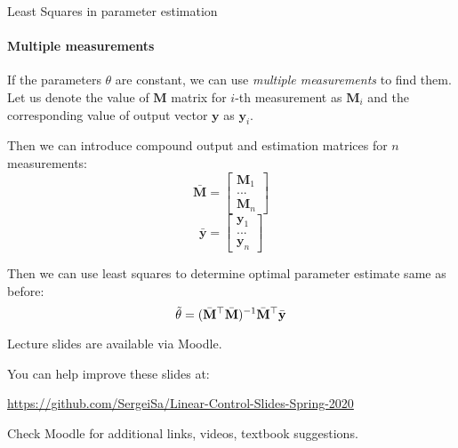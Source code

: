 \documentclass{beamer}
\begin{document}
\begin{frame}{Least Squares in parameter estimation}
\framesubtitle{Multiple measurements}
\begin{flushleft}

If the parameters $\theta$ are constant, we can use \emph{multiple measurements} to find them. Let us denote the value of $\mathbf M$ matrix for $i$-th measurement as $\mathbf M_i$ and the corresponding value of output vector $\mathbf y$ as $\mathbf y_i$. 

Then we can introduce compound output and estimation matrices for $n$ measurements:
\[
 \bar{\mathbf M} = \begin{bmatrix} \mathbf M_1 \\ ... \\ \mathbf M_n \end{bmatrix}
\]
\[
 \bar{\mathbf y} = \begin{bmatrix} \mathbf y_1 \\ ... \\ \mathbf y_n \end{bmatrix}
\]

Then we can use least squares to determine optimal parameter estimate same as before:
\[
 \Tilde{\theta} = (\bar{\mathbf M}^\top \bar{\mathbf M})^{-1} \bar{\mathbf M}^\top \bar{\mathbf y}
\]

\end{flushleft}
\end{frame}



\begin{frame}
\centerline{Lecture slides are available via Moodle.}
\bigskip
\centerline{You can help improve these slides at:}
\centerline{\url{https://github.com/SergeiSa/Linear-Control-Slides-Spring-2020}}
\bigskip
\centerline{Check Moodle for additional links, videos, textbook suggestions.}
\end{frame}
\end{document}
